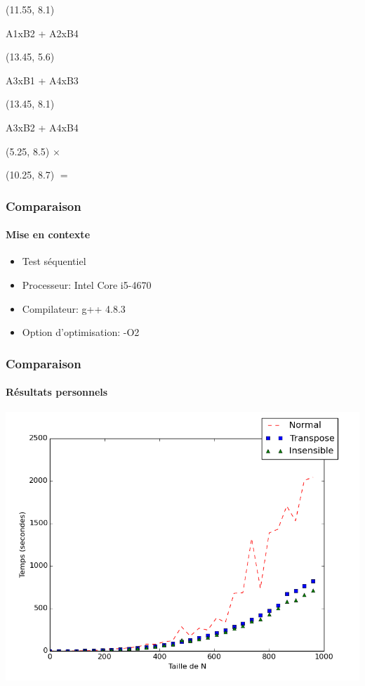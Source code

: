 \documentclass{beamer}
\begin{document}
\begin{frame}[fragile]
\begin{textblock}{1}(11.55, 8.1)
\begin{center}
	 A1xB2 + A2xB4
	 \end{center}	
\end{textblock}

\begin{textblock}{1}(13.45, 5.6)
\begin{center}
	 A3xB1 + A4xB3
	 \end{center}	
\end{textblock}

\begin{textblock}{1}(13.45, 8.1)
\begin{center}
	 A3xB2 + A4xB4
	 \end{center}	
\end{textblock}

\begin{textblock}{5}(5.25, 8.5)
	 \Huge{$\times$}
\end{textblock}

\begin{textblock}{5}(10.25, 8.7)
	 \Huge{$=$}
\end{textblock}

\end{frame}


\begin{frame}
\frametitle{Comparaison}
\framesubtitle{Mise en contexte}
\begin{itemize}
\item Test séquentiel
\item Processeur: Intel Core i5-4670
\item Compilateur: g++ 4.8.3
\item Option d'optimisation: -O2
\end{itemize}
\end{frame}

\begin{frame}
\frametitle{Comparaison}
\framesubtitle{Résultats personnels}
\begin{center}
\colorbox{white}{\includegraphics[scale=0.4]{matmult_all.png}}
\end{center}
\end{frame}
\end{document}

